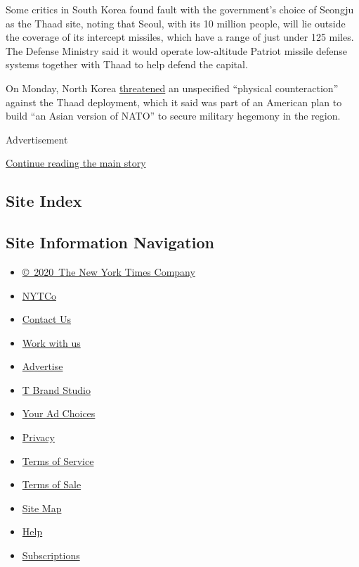 Some critics in South Korea found fault with the government's choice of
Seongju as the Thaad site, noting that Seoul, with its 10 million
people, will lie outside the coverage of its intercept missiles, which
have a range of just under 125 miles. The Defense Ministry said it would
operate low-altitude Patriot missile defense systems together with Thaad
to help defend the capital.

On Monday, North Korea
\href{http://www.nytimes.com/2016/07/12/world/asia/north-korea-missile-defense-thaad.html}{threatened}
an unspecified ``physical counteraction'' against the Thaad deployment,
which it said was part of an American plan to build ``an Asian version
of NATO'' to secure military hegemony in the region.

Advertisement

\protect\hyperlink{after-bottom}{Continue reading the main story}

\hypertarget{site-index}{%
\subsection{Site Index}\label{site-index}}

\hypertarget{site-information-navigation}{%
\subsection{Site Information
Navigation}\label{site-information-navigation}}

\begin{itemize}
\tightlist
\item
  \href{https://help.nytimes.com/hc/en-us/articles/115014792127-Copyright-notice}{©~2020~The
  New York Times Company}
\end{itemize}

\begin{itemize}
\tightlist
\item
  \href{https://www.nytco.com/}{NYTCo}
\item
  \href{https://help.nytimes.com/hc/en-us/articles/115015385887-Contact-Us}{Contact
  Us}
\item
  \href{https://www.nytco.com/careers/}{Work with us}
\item
  \href{https://nytmediakit.com/}{Advertise}
\item
  \href{http://www.tbrandstudio.com/}{T Brand Studio}
\item
  \href{https://www.nytimes.com/privacy/cookie-policy\#how-do-i-manage-trackers}{Your
  Ad Choices}
\item
  \href{https://www.nytimes.com/privacy}{Privacy}
\item
  \href{https://help.nytimes.com/hc/en-us/articles/115014893428-Terms-of-service}{Terms
  of Service}
\item
  \href{https://help.nytimes.com/hc/en-us/articles/115014893968-Terms-of-sale}{Terms
  of Sale}
\item
  \href{https://spiderbites.nytimes.com}{Site Map}
\item
  \href{https://help.nytimes.com/hc/en-us}{Help}
\item
  \href{https://www.nytimes.com/subscription?campaignId=37WXW}{Subscriptions}
\end{itemize}

